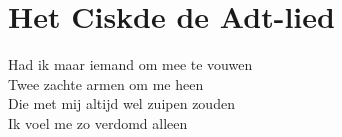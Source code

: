 \section{Het Ciskde de Adt-lied}
Had ik maar iemand om mee te vouwen\\
Twee zachte armen om me heen\\
Die met mij altijd wel zuipen zouden\\
Ik voel me zo verdomd alleen